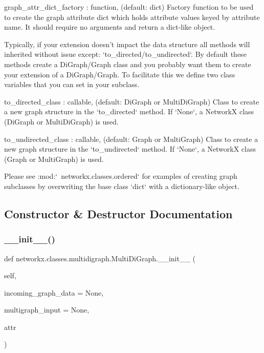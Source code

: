 \begin{DoxyVerb}
graph_attr_dict_factory : function, (default: dict)
    Factory function to be used to create the graph attribute
    dict which holds attribute values keyed by attribute name.
    It should require no arguments and return a dict-like object.

Typically, if your extension doesn't impact the data structure all
methods will inherited without issue except: `to_directed/to_undirected`.
By default these methods create a DiGraph/Graph class and you probably
want them to create your extension of a DiGraph/Graph. To facilitate
this we define two class variables that you can set in your subclass.

to_directed_class : callable, (default: DiGraph or MultiDiGraph)
    Class to create a new graph structure in the `to_directed` method.
    If `None`, a NetworkX class (DiGraph or MultiDiGraph) is used.

to_undirected_class : callable, (default: Graph or MultiGraph)
    Class to create a new graph structure in the `to_undirected` method.
    If `None`, a NetworkX class (Graph or MultiGraph) is used.

Please see :mod:`~networkx.classes.ordered` for examples of
creating graph subclasses by overwriting the base class `dict` with
a dictionary-like object.
\end{DoxyVerb}
 

\subsection{Constructor \& Destructor Documentation}
\mbox{\label{classnetworkx_1_1classes_1_1multidigraph_1_1MultiDiGraph_a1e28b57783d487534bf6e26291bca8b8}} 
\subsubsection{\texorpdfstring{\+\_\+\+\_\+init\+\_\+\+\_\+()}{\_\_init\_\_()}}
{\footnotesize\ttfamily def networkx.\+classes.\+multidigraph.\+Multi\+Di\+Graph.\+\_\+\+\_\+init\+\_\+\+\_\+ (\begin{DoxyParamCaption}\item[{}]{self,  }\item[{}]{incoming\+\_\+graph\+\_\+data = {\ttfamily None},  }\item[{}]{multigraph\+\_\+input = {\ttfamily None},  }\item[{}]{attr }\end{DoxyParamCaption})}

